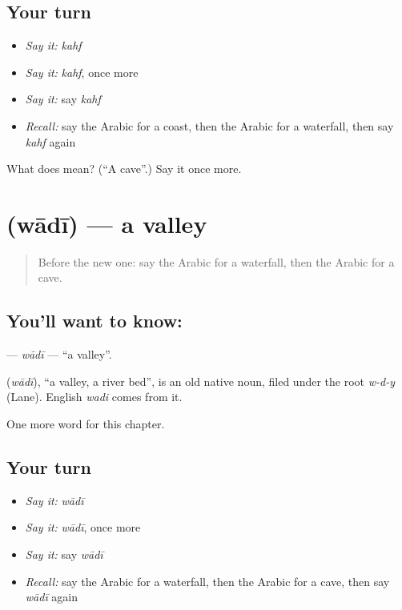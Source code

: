 \subsection*{Your turn}
\begin{itemize}
\raggedright
  \item \emph{Say it:} \emph{kahf}
  \item \emph{Say it:} \emph{kahf}, once more
  \item \emph{Say it:} say \emph{kahf}
  \item \emph{Recall:} say the Arabic for a coast, then the Arabic for a waterfall, then say \emph{kahf} again
\end{itemize}

\begin{tcolorbox}[breakable,colback=teal!4,colframe=teal!35!black,title={Before you move on}]
What does  mean? (\textquotedblleft{}A cave\textquotedblright{}.) Say it once more.
\end{tcolorbox}
\section[\texorpdfstring{\ar{وادي} (wādī)}{وادي (wādī)}]{ (wādī) — a valley}

\label{lesson:AR-C132-wadi}



\begin{quote}
Before the new one: say the Arabic for a waterfall, then the Arabic for a cave.
\end{quote}

\subsection*{You'll want to know: }
\textbf{} — \emph{wādī} — \textquotedblleft{}a valley\textquotedblright{}.

\begin{cousinweb}
\textbf{} (\emph{wādī}), \textquotedblleft{}a valley, a river bed\textquotedblright{}, is an old native noun, filed under the root \emph{w-d-y} (Lane). English \emph{wadi} comes from it.
\end{cousinweb}

\begin{grammarlens}[title={What you've built}]
One more word for this chapter.
\end{grammarlens}

\subsection*{Your turn}
\begin{itemize}
\raggedright
  \item \emph{Say it:} \emph{wādī}
  \item \emph{Say it:} \emph{wādī}, once more
  \item \emph{Say it:} say \emph{wādī}
  \item \emph{Recall:} say the Arabic for a waterfall, then the Arabic for a cave, then say \emph{wādī} again
\end{itemize}

